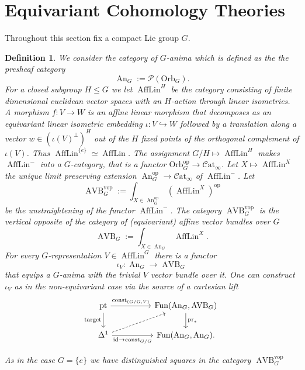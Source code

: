 \documentclass{article}
\newcommand{\Psh}{\mathcal{P}}
\newcommand{\pt}{\mathrm{pt}}
\newcommand{\op}{\mathrm{op}}
\newcommand{\vop}{\mathrm{vop}}
\newcommand{\pr}{\mathrm{pr}}
\newcommand{\id}{\mathrm{id}}
\DeclareMathOperator{\AVB}{AVB}
\DeclareMathOperator{\An}{An}
\newcommand{\catinfty}{\mathcal{C}\mathrm{at}_{\infty}}
\DeclareMathOperator{\Fun}{Fun}
\DeclareMathOperator{\AffLin}{AffLin}
\newtheorem{definition}{Definition}
\begin{document}
\section{Equivariant Cohomology Theories}

Throughout this section fix a compact Lie group $G$.

\begin{definition}
We consider the category of $G$-anima which is defined as the the presheaf category 
\[
\An_G := \Psh(\mathrm{Orb}_G).
\]
For a closed subgroup $H \leq G$ we let $\AffLin^H$ be the category consisting of finite dimensional euclidean vector spaces with an 
$H$-action through linear isometries. A morphism $f \colon V \to W$ is an affine linear morphism that 
decomposes as an equivariant linear isometric embedding $\iota \colon V \hookrightarrow W$ followed by a translation along a vector 
$w \in (\iota(V)^\perp)^H$ out of the $H$ fixed points of the orthogonal complement of $\iota(V)$.
Thus $\AffLin^{\{e\}} \simeq \AffLin$.
The assignment $G/H \mapsto \AffLin^H$ makes $\AffLin^{-}$ into a $G$-category, that is a functor 
$\mathrm{Orb}_G^\op \to \catinfty$.
Let $X \mapsto \AffLin^X$ the unique limit preserving extension $\An_G^\op \to \catinfty$ of $\AffLin^{-}$.
Let 
\[
  \AVB^\vop_G := \int_{X \in \An_G^\op} (\AffLin^{X})^\op   
\]
be the unstraightening of the functor $\AffLin^{-}$.
The category $\AVB^\vop_G$ is the vertical opposite of the \emph{category of (equivariant) affine vector bundles over $G$} 
\[
  \AVB_G := \int_{X \in \An_G} \AffLin^X.
\]
For every $G$-representation $V \in \AffLin^G$ there is a functor 
\[
\iota_V \colon \An_G \to \AVB_G    
\]
that equips a $G$-anima with the trivial $V$ vector bundle over it. One can construct $\iota_V$ 
as in the non-equivariant case via the source of a cartesian lift 
\[\begin{tikzcd}
	\pt && {\Fun(\An_G,\AVB_G)} \\
	{\Delta^1} && {\Fun(\An_G,\An_G)}
	\arrow["{\pr_*}", from=1-3, to=2-3]
	\arrow["{\id \to \mathrm{const}_{G/G}}"', from=2-1, to=2-3]
	\arrow["{\mathrm{const}_{(G/G,V)}}", from=1-1, to=1-3]
	\arrow["{\mathrm{target}}"', from=1-1, to=2-1]
	\arrow[dashed, from=2-1, to=1-3].
\end{tikzcd}\]

As in the case $G = \{e\}$ we have distinguished squares in the category $\AVB^\vop_G$





\end{definition}
\end{document}
